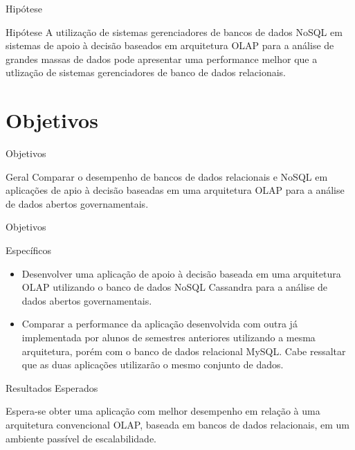 \begin{frame}{Hipótese}

\begin{block}{Hipótese}
A utilização de sistemas gerenciadores de bancos de dados NoSQL em sistemas de apoio à decisão baseados em arquitetura OLAP para a análise de grandes massas de dados pode apresentar uma performance melhor que a utlização de sistemas gerenciadores de banco de dados relacionais.
\end{block}

\end{frame}

\section{Objetivos}

\begin{frame}{Objetivos}

    \begin{block}{Geral}
    Comparar o desempenho de bancos de dados relacionais e NoSQL em aplicações de apio à decisão baseadas em uma arquitetura OLAP para a análise de dados abertos governamentais.
    \end{block}
    
\end{frame}

\begin{frame}{Objetivos}

    \begin{block}{Específicos}
    \begin{itemize}
        \item Desenvolver uma aplicação de apoio à decisão baseada em uma arquitetura OLAP utilizando o banco de dados NoSQL Cassandra para a análise de dados abertos governamentais.
        
        \item Comparar a performance da aplicação desenvolvida com outra já implementada por alunos de semestres anteriores utilizando a mesma arquitetura, porém com o banco de dados relacional MySQL. Cabe ressaltar que as duas aplicações utilizarão o mesmo conjunto de dados.
    \end{itemize}
    \end{block}

\end{frame}

\begin{frame}{Resultados Esperados}

Espera-se obter uma aplicação com melhor desempenho em relação à uma arquitetura convencional OLAP, baseada em bancos de dados relacionais, em um ambiente passível de escalabilidade.
  
\end{frame}

